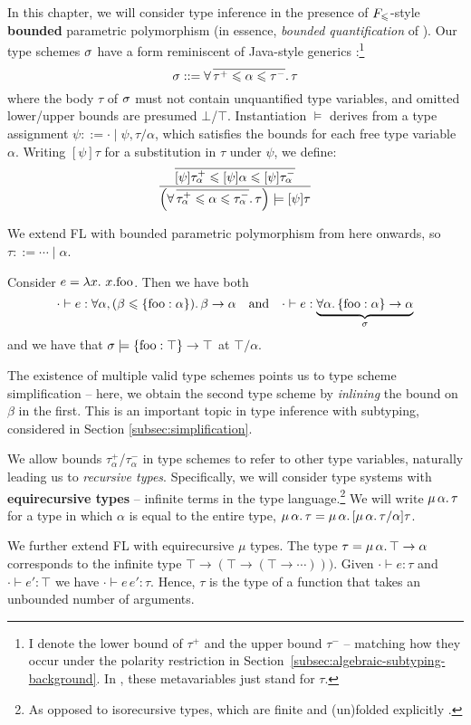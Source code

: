 In this chapter, we will consider type inference in the presence of $F_\leqslant$-style \textbf{bounded} parametric polymorphism (in essence, \emph{bounded quantification} of \textcite{bounded-quantification}). Our type schemes $\sigma$ have a form reminiscent of Java-style generics \cite{generic-java, simple-sub}:\footnote{I denote the lower bound of $\tau^+$ and the upper bound $\tau^-$ -- matching how they occur under the polarity restriction in Section~\ref{subsec:algebraic-subtyping-background}. In \inference{}, these metavariables just stand for $\tau$.}
$$ \sigma ::= \forall \, \overline{\tau^+ \leqslant \alpha \leqslant \tau^-} \ldotp \tau $$
where the body $\tau$ of $\sigma$ must not contain unquantified type variables, and omitted lower/upper bounds are presumed $\bot$/$\top$. 
Instantiation $\models$ derives from a type assignment $\psi ::= \cdot \mid \psi, \tau/\alpha$, which satisfies the bounds for each free type variable $\alpha$. Writing $[\psi]\tau$ for a substitution in $\tau$ under $\psi$, we define:
$$ \dfrac{\overline{[\psi]\tau_\alpha^+ \sub \substx{\psi} \alpha \sub [\psi]\tau_\alpha^-}}{\left( \forall\, \overline{\tau_\alpha^+ \sub \alpha \sub \tau_\alpha^-} \ldotp \tau \right) \models \substx{\psi}{\tau}} $$

\begin{example}
    We extend FL with bounded parametric polymorphism from here onwards, so $\tau ::= \cdots \mid \alpha$. 

    Consider $e = \lambda {x} \ldotp\, {x}{.}{\mathrm{foo}}$. Then we have both 
    $$ \cdot \vdash e : \forall \alpha, (\beta \sub \flrec{\mathrm{foo} : \alpha}) \ldotp \beta \to \alpha  \quad \text{and} \quad \cdot \vdash e : \underbrace{\forall \alpha \ldotp \flrec{\mathrm{foo} : \alpha} \to \alpha}_\sigma $$
    and we have that $\sigma \models \flrec{\mathrm{foo} : \top} \to \top$ at $\top/\alpha$.
    
    The existence of multiple valid type schemes points us to type scheme simplification -- here, we obtain the second type scheme by \emph{inlining} the bound on $\beta$ in the first. This is an important topic in type inference with subtyping, considered in Section \ref{subsec:simplification}.
\end{example}

We allow bounds $\tau_\alpha^+$/$\tau_\alpha^-$ in type schemes to refer to other type variables, naturally leading us to \emph{recursive types}.
Specifically, we will consider type systems with \textbf{equirecursive types} -- infinite terms in the type language.\footnote{As opposed to isorecursive types, which are finite and (un)folded explicitly \cite{tapl}.} We will write $\mu\,{\alpha}\ldotp \tau$ for a type in which $\alpha$ is equal to the entire type, \ie{} $\mu\,{\alpha}\ldotp  \tau = \mu\,{\alpha}\ldotp [\mu\,{\alpha}\ldotp \tau/\alpha] \tau$.
\begin{example}
    We further extend FL with equirecursive $\mu$ types. 
    The type $\tau = \mu\,{\alpha}\ldotp \top \to \alpha$ corresponds to the infinite type $\top \to (\top \to (\top \to \cdots)))$. Given $\cdot \vdash e : \tau$ and $\cdot \vdash e' : \top$ we have $\cdot \vdash e\,e' : \tau$. Hence, $\tau$ is the type of a function that takes an unbounded number of arguments.
\end{example}


